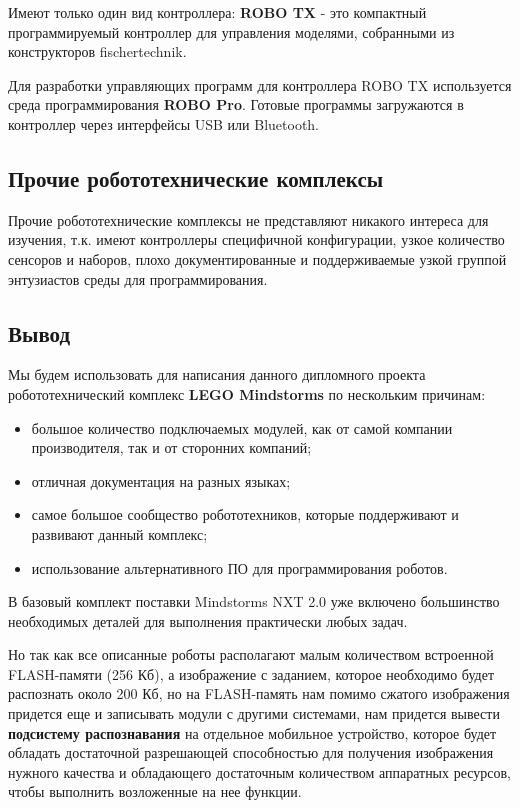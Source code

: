 Имеют только один вид контроллера: \textbf{ROBO TX} - это компактный программируемый контроллер для управления моделями, собранными из конструкторов fischertechnik.

Для разработки управляющих программ для контроллера ROBO TX используется среда программирования \textbf{ROBO Pro}. Готовые программы загружаются в контроллер через интерфейсы USB или Bluetooth.

\subsection{Прочие робототехнические комплексы}

Прочие робототехнические комплексы не представляют никакого интереса для изучения, т.к.  имеют контроллеры специфичной конфигурации, узкое количество сенсоров и наборов, плохо документированные и поддерживаемые узкой группой энтузиастов среды для программирования.

\subsection{Вывод}
Мы будем использовать для написания данного дипломного проекта робототехнический комплекс \textbf{LEGO Mindstorms} по нескольким причинам:
\begin{itemize}
\item большое количество подключаемых модулей, как от самой компании производителя, так и от сторонних компаний;
\item отличная документация на разных языках;
\item самое большое сообщество робототехников, которые поддерживают и развивают данный комплекс;
\item использование альтернативного ПО для программирования роботов.
\end{itemize}

В базовый комплект поставки Mindstorms NXT 2.0 уже включено большинство необходимых деталей для выполнения практически любых задач.

Но так как все описанные роботы располагают малым количеством встроенной FLASH-памяти (256 Кб), а изображение с заданием, которое необходимо будет распознать около 200 Кб, но на FLASH-память нам помимо сжатого изображения придется еще и записывать модули с другими системами, нам придется вывести \textbf{подсистему распознавания} на отдельное мобильное устройство, которое будет обладать достаточной разрешающей способностью для получения изображения нужного качества и обладающего достаточным количеством аппаратных ресурсов, чтобы выполнить возложенные на нее функции.

